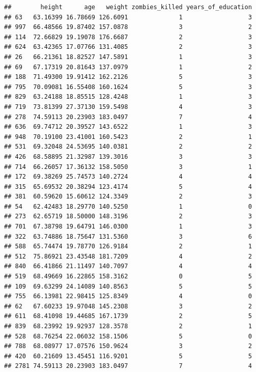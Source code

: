 \documentclass[]{article}
\begin{document}
\begin{verbatim}
##        height      age   weight zombies_killed years_of_education
## 63   63.16399 16.78669 126.6091              1                  3
## 997  66.48566 19.87402 157.0878              3                  2
## 114  72.66829 19.19078 176.6687              2                  3
## 624  63.42365 17.07766 131.4085              2                  3
## 26   66.21361 18.82527 147.5891              1                  3
## 69   67.17319 20.81643 137.0979              1                  2
## 188  71.49300 19.91412 162.2126              5                  3
## 795  70.09081 16.55408 160.1624              5                  3
## 829  63.24188 18.85515 128.4248              1                  3
## 719  73.81399 27.37130 159.5498              4                  3
## 278  74.59113 20.23903 183.0497              7                  4
## 636  69.74712 20.39527 143.6522              1                  3
## 948  70.19100 23.41001 160.5423              2                  1
## 531  69.32048 24.53695 140.0381              2                  2
## 426  68.58895 21.32987 139.3016              3                  3
## 714  66.26057 17.36132 158.5050              3                  1
## 172  69.38269 25.74573 140.2724              4                  4
## 315  65.69532 20.38294 123.4174              5                  4
## 381  60.59620 15.60612 124.3349              2                  3
## 54   62.42483 18.29770 140.5250              1                  0
## 273  62.65719 18.50000 148.3196              2                  3
## 701  67.38798 19.64791 146.0300              1                  3
## 322  63.74886 18.75647 131.5360              3                  6
## 588  65.74474 19.78770 126.9184              2                  1
## 512  75.86921 23.43548 181.7209              4                  2
## 840  66.41866 21.11497 140.7097              4                  4
## 519  68.49669 16.22865 158.3162              0                  5
## 109  69.63299 24.14089 140.8563              5                  5
## 755  66.13981 22.98415 125.8349              4                  0
## 62   67.60233 19.97048 145.2308              3                  2
## 611  68.41098 19.44685 167.1739              2                  5
## 839  68.23992 19.92937 128.3578              2                  1
## 528  68.76254 22.06032 158.1506              5                  0
## 788  68.08977 17.07576 150.9624              3                  2
## 420  60.21609 13.45451 116.9201              5                  5
## 2781 74.59113 20.23903 183.0497              7                  4

\end{verbatim}
\end{document}
